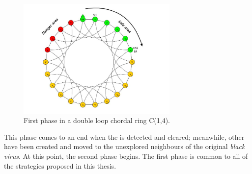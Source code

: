 \begin{figure}[h] 
  \centering
   
  \includegraphics[width=0.7\textwidth]{figures/dloop_ph1.jpg}
  \caption{First phase in a double loop chordal ring C(1,4).} \label{fig:ph1}
\end{figure}






  \begin{center}
\end{center}





This phase comes to an end when the \bv is detected and cleared; meanwhile, other \bvs have been created and moved to the unexplored neighbours of the original {\it black virus}. At this point, the second phase begins. The first phase is common to all of the strategies proposed in this thesis.



